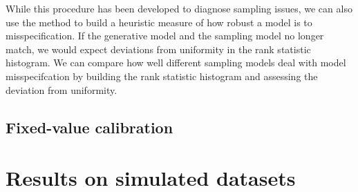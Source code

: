 \documentclass[fleqn,usenatbib]{mnras}
\begin{document}
While this procedure has been developed to diagnose sampling issues, we can also
use the method to build a heuristic measure of how robust a model is to
misspecification. If the generative model and the sampling model no longer
match, we would expect deviations from uniformity in the rank statistic
histogram. We can compare how well different sampling models deal with model
misspecifcation by building the rank statistic histogram and assessing the
deviation from uniformity.

\subsection{Fixed-value calibration}
\label{sec:methods.fixed}









\section{Results on simulated datasets}
\label{sec:results}
\end{document}
